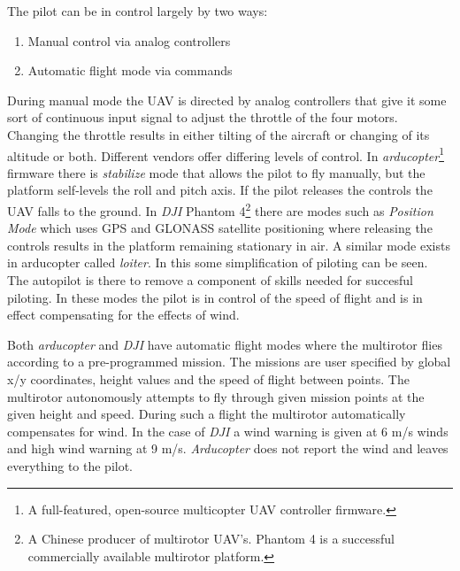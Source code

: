\documentclass[12pt,oneside]{reedthesis}
\providecommand{\tightlist}{%
  \setlength{\itemsep}{0pt}\setlength{\parskip}{0pt}}
\theoremstyle{definition}
\theoremstyle{definition}
\theoremstyle{definition}
\theoremstyle{remark}
\begin{document}
The pilot can be in control largely by two ways:
\begin{enumerate}
\def\labelenumi{\arabic{enumi}.}
\tightlist
\item
  Manual control via analog controllers
\item
  Automatic flight mode via commands
\end{enumerate}
During manual mode the UAV is directed by analog controllers that give
it some sort of continuous input signal to adjust the throttle of the
four motors. Changing the throttle results in either tilting of the
aircraft or changing of its altitude or both. Different vendors offer
differing levels of control. In \emph{arducopter}\footnote{A
  full-featured, open-source multicopter UAV controller firmware.}
firmware there is \emph{stabilize} mode that allows the pilot to fly
manually, but the platform self-levels the roll and pitch axis. If the
pilot releases the controls the UAV falls to the ground. In \emph{DJI}
Phantom 4\footnote{A Chinese producer of multirotor UAV's. Phantom 4 is
  a successful commercially available multirotor platform.} there are
modes such as \emph{Position Mode} which uses GPS and GLONASS satellite
positioning where releasing the controls results in the platform
remaining stationary in air. A similar mode exists in arducopter called
\emph{loiter}. In this some simplification of piloting can be seen. The
autopilot is there to remove a component of skills needed for succesful
piloting. In these modes the pilot is in control of the speed of flight
and is in effect compensating for the effects of wind.

Both \emph{arducopter} and \emph{DJI} have automatic flight modes where
the multirotor flies according to a pre-programmed mission. The missions
are user specified by global x/y coordinates, height values and the
speed of flight between points. The multirotor autonomously attempts to
fly through given mission points at the given height and speed. During
such a flight the multirotor automatically compensates for wind. In the
case of \emph{DJI} a wind warning is given at 6 m/s winds and high wind
warning at 9 m/s. \emph{Arducopter} does not report the wind and leaves
everything to the pilot.
\end{document}
